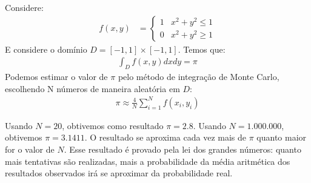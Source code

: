 \documentclass[12pt]{article}
\newenvironment{exercise}[2][Exercício]{\begin{trivlist}
\item[\hskip \labelsep {\bfseries #1}\hskip \labelsep {\bfseries #2.}]}{\end{trivlist}}
\begin{document}
\begin{exercise}{2}
Considere:
\begin{align*}
f(x,y) &= \begin{cases}
1 & x^2 + y^2 \leq 1\\
0 & x^2 + y^2 \geq 1
\end{cases}
\end{align*}
E considere o domínio $D = [-1,1] \times [-1,1]$. Temos que:
\begin{align*}
\int_D f(x,y)dxdy = \pi
\end{align*}
Podemos estimar o valor de $\pi$ pelo método de integração de Monte Carlo,
escolhendo N números de maneira aleatória em $D$:
\begin{align*}
\pi \approx \frac{4}{N}\sum_{i=1}^{N}f(x_i,y_i)
\end{align*}

Usando $N=20$, obtivemos como resultado $\pi = 2.8$. Usando $N=1.000.000$,
obtivemos $\pi = 3.1411$. O resultado se aproxima cada vez mais de $\pi$ quanto
maior for o valor de $N$. Esse resultado é provado pela lei dos grandes números:
quanto mais tentativas são realizadas, mais a probabilidade da média aritmética
dos resultados observados irá se aproximar da probabilidade real.

 
\end{exercise}
\end{document}
